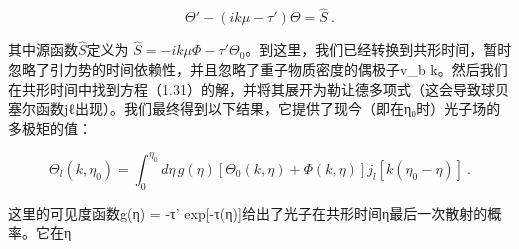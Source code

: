 \[ \Theta' - (ik\mu - \tau') \Theta = \hat{S}~. \]

其中源函数\( \hat{S} \)定义为 \( \hat{S} = -ik\mu \Phi - \tau' \Theta_0 \)。到这里，我们已经转换到共形时间，暂时忽略了引力势的时间依赖性，并且忽略了重子物质密度的偶极子v_b k。然后我们在共形时间中找到方程（1.31）的解，并将其展开为勒让德多项式（这会导致球贝塞尔函数jℓ出现）。我们最终得到以下结果，它提供了现今（即在η₀时）光子场的多极矩的值：

\[ \Theta_l(k, \eta_0) = \int_0^{\eta_0} d\eta \, g(\eta) \left[ \Theta_0(k, \eta) + \Phi(k, \eta) \right] j_l[k(\eta_0 - \eta)]~.\]

这里的可见度函数g(η) = -τ' exp[-τ(η)]给出了光子在共形时间η最后一次散射的概率。它在η 

